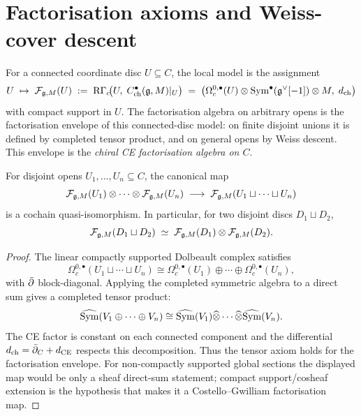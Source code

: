 \section{Factorisation axioms and Weiss-cover descent}
\label{sec:ch-ce-factorisation-axioms}

\begin{definition}
\label{def:ch-ce-factalg}
%
For a connected coordinate disc $U\subseteq C$, the local model is the
assignment
\begin{equation}
\label{eq:factalg-defn}
U \;\mapsto\; \mathcal{F}_{\mathfrak{g},M}(U)
\;:=\;
\mathrm{R}\Gamma_c\!\bigl(U,\;C^\bullet_{\mathrm{ch}}(\mathfrak{g},M)|_U\bigr)
\;=\;
\bigl(\Omega^{0,\bullet}_c(U)\otimes\mathrm{Sym}^\bullet(\mathfrak{g}^\vee[-1])\otimes M,\;
d_{\mathrm{ch}}\bigr)
\end{equation}
with compact support in $U$. The factorisation algebra on arbitrary
opens is the factorisation envelope of this connected-disc model: on
finite disjoint unions it is defined by completed tensor product, and
on general opens by Weiss descent. This envelope is the
\emph{chiral CE factorisation algebra on $C$}.
\end{definition}

\begin{theorem}
\label{thm:ch-ce-tensor-axiom}
%
For disjoint opens $U_1,\ldots,U_n\subseteq C$, the canonical map
\begin{equation}
\label{eq:tensor-factor-iso}
\mathcal{F}_{\mathfrak{g},M}(U_1)\otimes\cdots\otimes\mathcal{F}_{\mathfrak{g},M}(U_n)
\;\longrightarrow\;
\mathcal{F}_{\mathfrak{g},M}(U_1\sqcup\cdots\sqcup U_n)
\end{equation}
is a cochain quasi-isomorphism. In particular, for two disjoint
discs $D_1\sqcup D_2$,
\begin{equation}
\mathcal{F}_{\mathfrak{g},M}(D_1\sqcup D_2)
\;\simeq\;
\mathcal{F}_{\mathfrak{g},M}(D_1)\otimes\mathcal{F}_{\mathfrak{g},M}(D_2).
\end{equation}
\end{theorem}

\begin{proof}
The linear compactly supported Dolbeault complex satisfies
\[
\Omega^{0,\bullet}_c(U_1\sqcup\cdots\sqcup U_n)
\cong
\Omega^{0,\bullet}_c(U_1)\oplus\cdots\oplus
\Omega^{0,\bullet}_c(U_n),
\]
with $\bar\partial$ block-diagonal. Applying the completed symmetric algebra
to a direct sum gives a completed tensor product:
\[
\widehat{\mathrm{Sym}}(V_1\oplus\cdots\oplus V_n)
\cong
\widehat{\mathrm{Sym}}(V_1)\widehat\otimes\cdots\widehat\otimes
\widehat{\mathrm{Sym}}(V_n).
\]
The CE factor is constant on each connected component and the
differential $d_{\mathrm{ch}}=\bar\partial_C+d_{\mathrm{CE}}$ respects this
decomposition. Thus the tensor axiom holds for the factorisation
envelope. For non-compactly supported global sections the displayed map
would be only a sheaf direct-sum statement; compact support/cosheaf
extension is the hypothesis that makes it a Costello--Gwilliam
factorisation map.
\end{proof}

